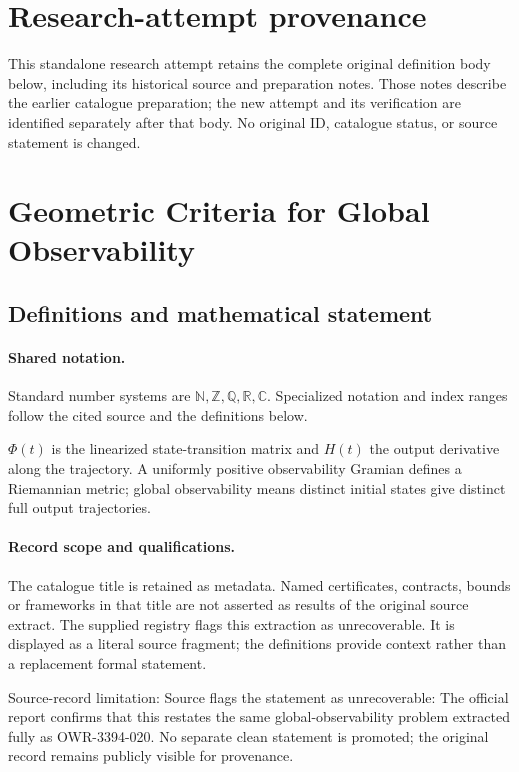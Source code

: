 \documentclass[11pt]{article}
\begin{document}
\section*{Research-attempt provenance}
This standalone research attempt retains the complete original definition body below,
including its historical source and preparation notes. Those notes describe the
earlier catalogue preparation; the new attempt and its verification are identified
separately after that body. No original ID, catalogue status, or source statement is changed.

\section{Geometric Criteria for Global Observability}\label{statement}

\subsection{Definitions and mathematical statement}

\paragraph{Shared notation.}Standard number systems are $\mathbb N,\mathbb Z,\mathbb Q,\mathbb R,\mathbb C$. Specialized notation and index ranges follow the cited source and the definitions below.


$\Phi(t)$ is the linearized state-transition matrix and $H(t)$ the output derivative along the trajectory. A uniformly positive observability Gramian defines a Riemannian metric; global observability means distinct initial states give distinct full output trajectories.
\paragraph{Record scope and qualifications.}
The catalogue title is retained as metadata. Named certificates, contracts, bounds or frameworks in that title are not asserted as results of the original source extract.
The supplied registry flags this extraction as unrecoverable. It is displayed as a literal source fragment; the definitions provide context rather than a replacement formal statement.

Source-record limitation: Source flags the statement as unrecoverable: The official report confirms that this restates the same global-observability problem extracted fully as OWR-3394-020. No separate clean statement is promoted; the original record remains publicly visible for provenance.
\end{document}

